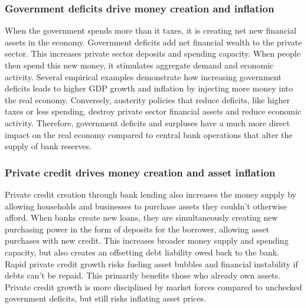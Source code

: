 \subsubsection{Government deficits drive money creation and inflation}

When the government spends more than it taxes, it is creating net new financial assets in the economy. Government deficits add net financial wealth to the private sector.
This increases private sector deposits and spending capacity. When people then spend this new money, it stimulates aggregate demand and economic activity.
Several empirical examples demonstrate how increasing government deficits leads to higher GDP growth and inflation by injecting more money into the real economy.
Conversely, austerity policies that reduce deficits, like higher taxes or less spending, destroy private sector financial assets and reduce economic activity.
Therefore, government deficits and surpluses have a much more direct impact on the real economy compared to central bank operations that alter the supply of bank reserves.
\subsubsection{Private credit drives money creation and asset inflation}

Private credit creation through bank lending also increases the money supply by allowing households and businesses to purchase assets they couldn't otherwise afford.
When banks create new loans, they are simultaneously creating new purchasing power in the form of deposits for the borrower, allowing asset purchases with new credit.
This increases broader money supply and spending capacity, but also creates an offsetting debt liability owed back to the bank.
Rapid private credit growth risks fueling asset bubbles and financial instability if debts can't be repaid. This primarily benefits those who already own assets.
Private credit growth is more disciplined by market forces compared to unchecked government deficits, but still risks inflating asset prices.
